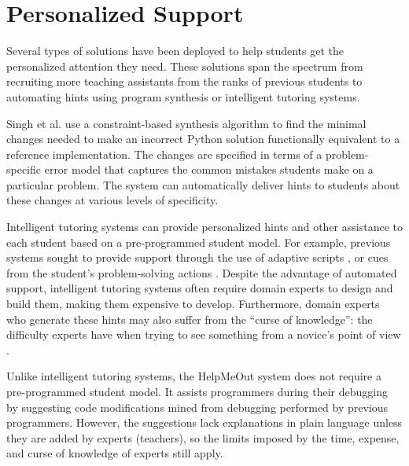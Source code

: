 \section{Personalized Support}
Several types of solutions have been deployed to help students get the personalized attention they need. These solutions span the spectrum from recruiting more teaching assistants from the ranks of previous students \cite{communityTAs} to automating hints using program synthesis or intelligent tutoring systems. 

Singh et al. \cite{rishabh} use a constraint-based synthesis algorithm to find the minimal changes needed to make an incorrect Python solution functionally equivalent to a reference implementation. The changes are specified in terms of a problem-specific error model that captures the common mistakes students make on a particular problem. The system can automatically deliver hints to students about these changes at various levels of specificity. 

Intelligent tutoring systems can provide personalized hints and other assistance to each student based on a pre-programmed student model. For example, previous systems sought to provide support through the use of adaptive scripts \cite{kumar2007tutorial}, or cues from the student’s problem-solving actions \cite{diziol}. Despite the advantage of automated support, intelligent tutoring systems often require domain experts to design and build them, making them expensive to develop.  Furthermore, domain experts who generate these hints may also suffer from the ``curse of knowledge'': the difficulty experts have when trying to see something from a novice's point of view \cite{curse}. 

Unlike intelligent tutoring systems, the HelpMeOut system \cite{helpmeout} does not require a pre-programmed student model. It assists programmers during their debugging by suggesting code modifications mined from debugging performed by previous programmers. However, the suggestions lack explanations in plain language unless they are added by experts (teachers), so the limits imposed by the time, expense, and curse of knowledge of experts still apply.

